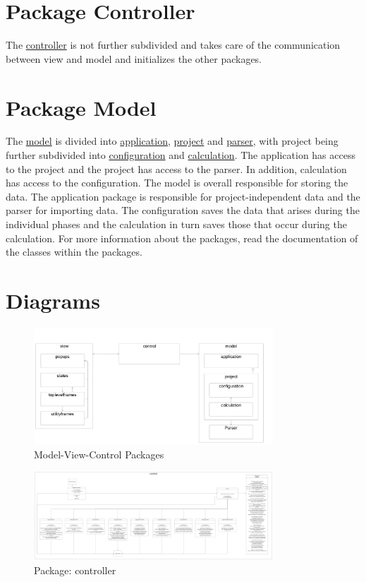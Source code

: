 \documentclass[parskip=full]{report} %
\begin{document}
\section{Package Controller}
The \hyperlink{controller}{controller} is not further subdivided and takes care of the communication between view and model and initializes the other packages.

\section{Package Model}
The \hyperlink{model}{model} is divided into \hyperlink{application}{application}, \hyperlink{project}{project} and \hyperlink{parser}{parser}, with project being further subdivided into \hyperlink{configuration}{configuration} and \hyperlink{calculation}{calculation}. The application has access to the project and the project has access to the parser. In addition, calculation has access to the configuration. The model is overall responsible for storing the data. The application package is responsible for project-independent data and the parser for importing data. The configuration saves the data that arises during the individual phases and the calculation in turn saves those that occur during the calculation. For more information about the packages, read the documentation of the classes within the packages.

\section{Diagrams}

\hypertarget{mvc}{
\begin{figure}[hbt!]
  \centering
\includegraphics[width=0.8\textwidth]
        {pictures/mvc.png}
  \caption{Model-View-Control Packages}
  \label{fig:mvc}
\end{figure}
}

\hypertarget{controller}{
\begin{figure}[hbt!]
  \centering
\includegraphics[width=0.8\textwidth]
        {pictures/controller.png}
  \caption{Package: controller}
  \label{fig:mvc}
\end{figure}
}
\end{document}
